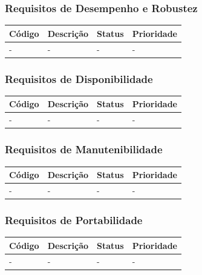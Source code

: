 \documentclass[a4paper, 12pt]{article}
\begin{document}
\subsubsection{Requisitos de Desempenho e Robustez}
\begin{table}[ht]
	\centering
	
	\begin{tabular}{p{2cm}p{7cm}p{2cm}p{2cm}}
		\hline
		\cellcolor{gray}Código&\cellcolor{gray}Descrição&\cellcolor{gray}Status&\cellcolor{gray}Prioridade  \\
		\hline
		-&-&-&-\\
		\hline
	\end{tabular}
\end{table}%
\newpage
\subsubsection{Requisitos de Disponibilidade}
\begin{table}[ht]
	\rowcolors{1}{}{}
	\centering
	
	\begin{tabular}{p{2cm}p{7cm}p{2cm}p{2cm}}
		\hline
		\cellcolor{gray}Código&\cellcolor{gray}Descrição&\cellcolor{gray}Status&\cellcolor{gray}Prioridade  \\
		\hline
		-&-&-&-\\
		\hline
	\end{tabular}
\end{table}%
\subsubsection{Requisitos de Manutenibilidade}
\begin{table}[ht]
	\centering
	
	\begin{tabular}{p{2cm}p{7cm}p{2cm}p{2cm}}
		\hline
		\cellcolor{gray}Código&\cellcolor{gray}Descrição&\cellcolor{gray}Status&\cellcolor{gray}Prioridade  \\
		\hline
		-&-&-&-\\
		\hline
	\end{tabular}
\end{table}%
\subsubsection{Requisitos de Portabilidade}
\begin{table}[ht]
	\centering
	
	\begin{tabular}{p{2cm}p{7cm}p{2cm}p{2cm}}
		\hline
		\cellcolor{gray}Código&\cellcolor{gray}Descrição&\cellcolor{gray}Status&\cellcolor{gray}Prioridade  \\
		\hline
		-&-&-&-\\
		\hline
	\end{tabular}
\end{table}%
\newpage
\end{document}
